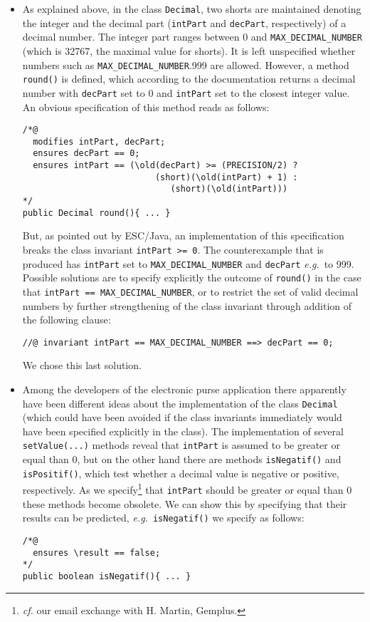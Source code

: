 \documentclass[a4paper]{llncs}
\begin{document}
\begin{itemize}
\item As explained above, in the class \texttt{Decimal}, two shorts
are maintained denoting the integer and the decimal part
(\texttt{intPart} and \texttt{decPart}, respectively) of a decimal
number. The integer part ranges between 0 and
\texttt{MAX\_DECIMAL\_NUMBER} (which is 32767, the maximal value for
shorts). It is left unspecified whether numbers such as
\texttt{MAX\_DECIMAL\_NUMBER}.999 are allowed. However, 
a method \texttt{round()} is defined, which
according to the documentation returns a decimal number with
\texttt{decPart} set to 0 and \texttt{intPart} set to the closest
integer value. An obvious specification of this method reads as
follows:
\begin{verbatim}
/*@ 
  modifies intPart, decPart;
  ensures decPart == 0;
  ensures intPart == (\old(decPart) >= (PRECISION/2) ?
                          (short)(\old(intPart) + 1) :
                             (short)(\old(intPart)))
*/
public Decimal round(){ ... }
\end{verbatim}
But, as pointed out by ESC/Java, an implementation of this
specification breaks the class invariant \texttt{intPart >= 0}. The
counterexample that is produced has
\texttt{intPart} set to \texttt{MAX\_DECIMAL\_NUMBER} and
\texttt{decPart} \emph{e.g.}~to 999. Possible solutions are to
specify explicitly the outcome of \texttt{round()} in the case that
\texttt{intPart == MAX\_DECIMAL\_NUMBER}, or to restrict the set of
valid decimal numbers by further strengthening of the class invariant
through addition of the following clause:
\begin{verbatim}
//@ invariant intPart == MAX_DECIMAL_NUMBER ==> decPart == 0;
\end{verbatim}
We chose this last solution. 

\item Among the developers of the electronic purse application there
apparently have been different ideas about the implementation of the
class \texttt{Decimal} (which could have been avoided if the class
invariants immediately would have been specified explicitly in the
class). The implementation of several
\texttt{setValue(...)} methods
reveal that \texttt{intPart} is assumed to be greater or equal than
0, but on the other hand there are methods
\texttt{isNegatif()} and \texttt{isPositif()}, which test whether a
decimal value is negative or positive, respectively. As we
specify\footnote{\emph{cf.} our email exchange with H. Martin,
Gemplus.} that \texttt{intPart} should be greater or equal than 0
these methods become obsolete. We can show this by specifying that
their results can be predicted, \emph{e.g.}~\texttt{isNegatif()} we
specify as follows:
\begin{verbatim}
/*@ 
  ensures \result == false;
*/
public boolean isNegatif(){ ... }
\end{verbatim}



\end{itemize}
\end{document}
